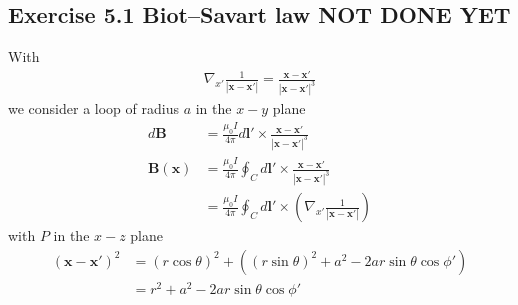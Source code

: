 \documentclass[10pt,a4paper]{book}
\theoremstyle{definition}
\begin{document}
\subsection{Exercise 5.1 Biot–Savart law NOT DONE YET}
With
\begin{align}
\nabla_{x'}\frac{1}{|\mathbf{x}-\mathbf{x'}|}
=\frac{\mathbf{x}-\mathbf{x'}}{|\mathbf{x}-\mathbf{x'}|^3}
\end{align}
we consider a loop of radius $a$ in the $x-y$ plane
\begin{align}
d\mathbf{B}&=\frac{\mu_0I}{4\pi}d\mathbf{l}'\times\frac{\mathbf{x}-\mathbf{x'}}{|\mathbf{x}-\mathbf{x'}|^3}\\
\mathbf{B}(\mathbf{x})
&=\frac{\mu_0I}{4\pi}\oint_{C}d\mathbf{l}'\times\frac{\mathbf{x}-\mathbf{x'}}{|\mathbf{x}-\mathbf{x'}|^3}\\
&=\frac{\mu_0I}{4\pi}\oint_{C}d\mathbf{l}'\times\left(\nabla_{x'}\frac{1}{|\mathbf{x}-\mathbf{x'}|}\right)
\end{align}
with $P$ in the $x-z$ plane
\begin{align}
(\mathbf{x}-\mathbf{x'})^2
&=(r\cos\theta)^2+((r\sin\theta)^2+a^2-2ar\sin\theta\cos\phi')\\
&=r^2+a^2-2ar\sin\theta\cos\phi'
\end{align}
\end{document}
